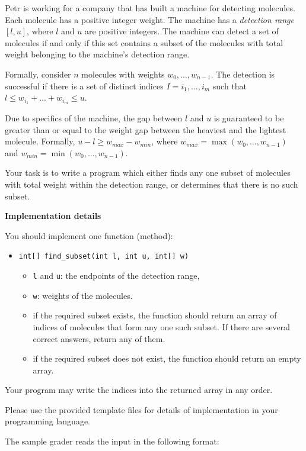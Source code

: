 Petr is working for a company that has built a machine for detecting molecules. Each molecule has a positive integer weight. The machine has a \textit{detection range} $[l, u]$, where $l$ and $u$ are positive integers. The machine can detect a set of molecules if and only if this set contains a subset of the molecules with total weight belonging to the machine's detection range.  

Formally, consider $n$ molecules with weights $w_0, \ldots, w_{n - 1}$. The detection is successful if there is a set of distinct indices $I = {i_1, \ldots , i_m}$ such that $l \le w_{i_1} + \ldots + w_{i_m} \le u$.

Due to specifics of the machine, the gap between $l$ and $u$ is guaranteed to be greater than or equal to the weight gap between the heaviest and the lightest molecule. Formally, $u - l \ge w_{max} - w_{min}$, where $w_{max}=\max(w_0, \ldots, w_{n - 1})$ and $w_{min}=\min(w_0, \ldots, w_{n - 1})$.

Your task is to write a program which either finds any one subset of molecules with total weight within the detection range, or determines that there is no such subset.

\textbf{Implementation details}

You should implement one function (method):

\begin{itemize}
\item \texttt{int[] find\_subset(int l, int u, int[] w)}
\begin{itemize}
\item \texttt{l} and \texttt{u}: the endpoints of the detection range,
\item \texttt{w}: weights of the molecules.
\item if the required subset exists, the function should return an array of indices of molecules that form any one such subset. If there are several correct answers, return any of them.
\item if the required subset does not exist, the function should return an empty array.
\end{itemize}
\end{itemize}

Your program may write the indices into the returned array in any order.

Please use the provided template files for details of implementation in your programming language.

The sample grader reads the input in the following format: